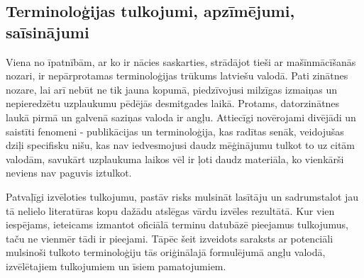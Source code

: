 \documentclass[12pt, a4paper]{article}
\numberwithin{equation}{section} %
\begin{document}
\subsection*{Terminoloģijas tulkojumi, apzīmējumi, saīsinājumi} %

Viena no īpatnībām, ar ko ir nācies saskarties, strādājot tieši ar mašīnmācīšanās nozari, ir nepārprotamas terminoloģijas trūkums latviešu valodā. Pati zinātnes nozare, lai arī nebūt ne tik jauna kopumā, piedzīvojusi milzīgas izmaiņas un nepieredzētu uzplaukumu pēdējās desmitgades laikā. Protams, datorzinātnes laukā pirmā un galvenā saziņas valoda ir angļu. Attiecīgi novērojami divējādi un saistīti fenomeni - publikācijas un terminoloģija, kas radītas senāk, veidojušas dziļi specifisku nišu, kas nav iedvesmojusi daudz mēģinājumu tulkot to uz citām valodām, savukārt uzplaukuma laikos vēl ir ļoti daudz materiāla, ko vienkārši neviens nav paguvis iztulkot.

Patvaļīgi izvēloties tulkojumu, pastāv risks mulsināt lasītāju un sadrumstalot jau tā nelielo literatūras kopu dažādu atslēgas vārdu izvēles rezultātā. Kur vien iespējams, ieteicams izmantot oficiālā terminu datubāzē pieejamus tulkojumus, taču ne vienmēr tādi ir pieejami. Tāpēc šeit izveidots saraksts ar potenciāli mulsinoši tulkoto terminoloģiju tās oriģinālajā formulējumā angļu valodā, izvēlētajiem tulkojumiem un īsiem pamatojumiem.  
\end{document}
